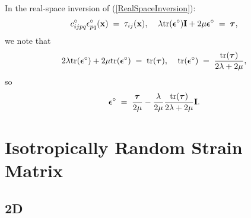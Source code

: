\documentclass[12pt]{article}
\def\bmath#1{\mbox{\boldmath$#1$}}
\begin{document}
In the real-space inversion of (\ref{RealSpaceInversion}):
\begin{equation}
 c^\circ_{ijpq} \epsilon^\circ_{pq}({\bf x}) 
 \;=\; \tau_{ij}({\bf x}), \;\;\;\;
 \lambda{\rm tr}(\bmath{\epsilon}^\circ){\bf I} + 
 2\mu\bmath{\epsilon}^\circ \;=\; \bmath{\tau},
\end{equation}
we note that
\begin{equation}
 2\lambda{\rm tr}(\bmath{\epsilon}^\circ) + 
 2\mu {\rm tr}(\bmath{\epsilon}^\circ)
\;=\; {\rm tr}(\bmath{\tau}), \;\;\;\;
 {\rm tr}(\bmath{\epsilon}^\circ) \;=\; 
 \frac{{\rm tr}(\bmath{\tau})}{2\lambda+2\mu},
\end{equation}
so 
\begin{equation}
  \bmath{\epsilon}^\circ \;=\; \frac{\bmath{\tau}}{2\mu} - 
  \frac{\lambda}{2\mu}
 \frac{{\rm tr}(\bmath{\tau})}{2\lambda+2\mu} {\bf I}.
 \label{IsotropicStrainStress2D}
\end{equation}


\section{Isotropically Random Strain Matrix}

\subsection{2D}
\end{document}
